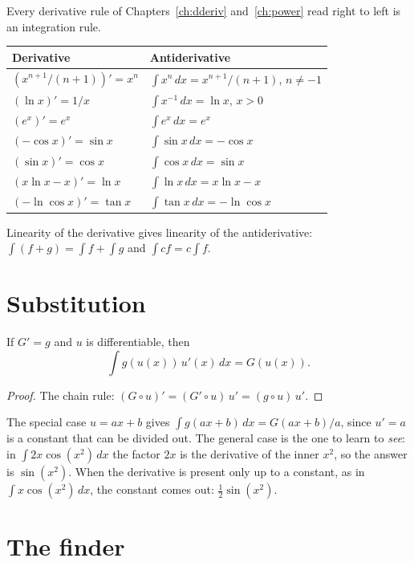 Every derivative rule of Chapters~\ref{ch:dderiv} and~\ref{ch:power} read right to left is an
integration rule.

\begin{center}
\begin{tabular}{ll}
  \toprule
  Derivative & Antiderivative \\
  \midrule
  $(x^{n+1}/(n+1))' = x^n$ & $\int x^n\,dx = x^{n+1}/(n+1)$, $n \neq -1$ \\
  $(\ln x)' = 1/x$ & $\int x^{-1}\,dx = \ln x$, $x > 0$ \\
  $(e^x)' = e^x$ & $\int e^x\,dx = e^x$ \\
  $(-\cos x)' = \sin x$ & $\int \sin x\,dx = -\cos x$ \\
  $(\sin x)' = \cos x$ & $\int \cos x\,dx = \sin x$ \\
  $(x \ln x - x)' = \ln x$ & $\int \ln x\,dx = x\ln x - x$ \\
  $(-\ln \cos x)' = \tan x$ & $\int \tan x\,dx = -\ln \cos x$ \\
  \bottomrule
\end{tabular}
\end{center}

Linearity of the derivative gives linearity of the antiderivative: $\int (f + g) = \int f +
\int g$ and $\int cf = c \int f$.

\section{Substitution}

\begin{theorem}[Substitution]
  If $G' = g$ and $u$ is differentiable, then
  \[ \int g(u(x))\,u'(x)\,dx = G(u(x)). \]
\end{theorem}
\begin{proof}
  The chain rule: $(G \circ u)' = (G' \circ u)\, u' = (g \circ u)\, u'$.
\end{proof}

The special case $u = ax + b$ gives $\int g(ax + b)\,dx = G(ax+b)/a$, since $u' = a$ is a
constant that can be divided out. The general case is the one to learn to \emph{see}: in
$\int 2x \cos(x^2)\,dx$ the factor $2x$ is the derivative of the inner $x^2$, so the answer is
$\sin(x^2)$. When the derivative is present only up to a constant, as in $\int x \cos(x^2)\,dx$,
the constant comes out: $\frac{1}{2}\sin(x^2)$.

\section{The finder}


